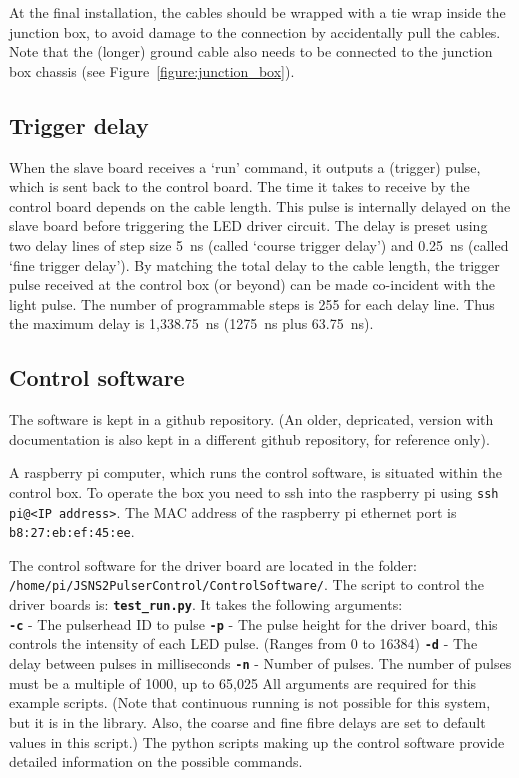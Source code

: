 At the final installation, the cables should be wrapped with a tie wrap inside the junction box, to avoid damage to the connection by accidentally pull the cables. Note that the (longer) ground cable also needs to be connected to the junction box chassis (see Figure~\ref{figure:junction_box}).

\subsection*{Trigger delay}
When the slave board receives a `run' command, it outputs a (trigger) pulse, which is sent back to the control board. The time it takes to receive by the control board depends on the cable length. This pulse is internally delayed on the slave board before triggering the LED driver circuit. The delay is preset using two delay lines of step size 5~ns (called `course trigger delay') and 0.25~ns (called `fine trigger delay'). By matching the total delay to the cable length, the trigger pulse received at the control box (or beyond) can be made co-incident with the light pulse. The number of programmable steps is 255 for each delay line. Thus the maximum delay is 1,338.75~ns (1275~ns plus 63.75~ns).


\subsection*{Control software}

The software is kept in a  github repository\cite{GITHUB_SOFT}.
(An older, depricated, version with documentation is also kept in a different github repository\cite{GITHUB_TEST}, for reference only).
 
A raspberry pi computer, which runs the control software, is situated within the control box. To operate the box you need to ssh into the raspberry pi using \texttt{ssh pi@<IP address>}. The MAC address of the raspberry pi ethernet port is \texttt{b8:27:eb:ef:45:ee}.

The control software for the driver board are located in the folder: \texttt{/home/pi/JSNS2PulserControl/ControlSoftware/}.
The script to control the driver boards is: \texttt{\textbf{test\_run.py}}.
It takes the following arguments:\\
\newline
\texttt{\textbf{-c}} - The pulserhead ID to pulse \newline
\texttt{\textbf{-p}} - The pulse height for the driver board, this controls the intensity of each LED pulse. (Ranges from 0 to 16384)\newline
\texttt{\textbf{-d}} - The delay between pulses in milliseconds \newline
\texttt{\textbf{-n}} - Number of pulses. The number of pulses must be a multiple of 1000, up to 65,025
\newline
All arguments are required for this example scripts. (Note that continuous running is not possible for this system, but it is in the library. Also, the coarse and fine fibre delays are set to default values in this script.) The python scripts making up the control software provide detailed information on the possible commands.
